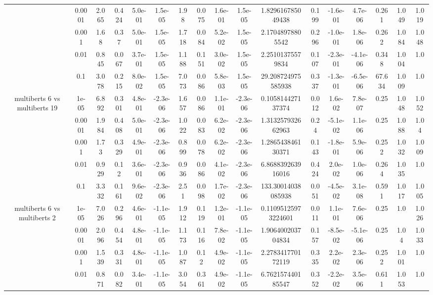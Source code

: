 \begin{tabular}{|c|c|c|c|c|c|c|c|c|c|c|c|c|c|c|c|c|}
 & 0.0001 & 2.065 & 0.424 & 5.0e-01 & 1.5e-05 & 1.98 & 0.075 & 1.6e-01 & 1.5e-05 & 1.829616785049438 & 0.199 & -1.6e-01 & 4.7e-06 & 0.261 & 1.049 & 1.019 \\
 & 0.001 & 1.68 & 0.37 & 5.0e-01 & 1.5e-05 & 1.718 & 0.084 & 5.2e-02 & 1.5e-05 & 2.17048978805542 & 0.296 & -1.0e-01 & 1.8e-06 & 0.262 & 1.084 & 1.048 \\
 & 0.01 & 0.845 & 0.067 & 3.7e-01 & 1.5e-05 & 1.188 & 0.151 & 3.0e-02 & 1.5e-05 & 2.25101375579834 & 0.107 & -2.3e-01 & -4.1e-06 & 0.348 & 1.004 & 1.0 \\
 & 0.1 & 3.078 & 0.215 & 8.0e-02 & 1.5e-05 & 7.073 & 0.086 & 5.8e-03 & 1.5e-05 & 29.208724975585938 & 0.337 & -1.3e-01 & -6.5e-06 & 67.634 & 1.009 & 1.0 \\
\hline
\multirow{5}{*}{multiberts 6 vs multiberts 19} & 1e-05 & 6.892 & 0.301 & 4.8e-01 & -2.3e-06 & 1.657 & 0.086 & 1.1e-01 & -2.3e-06 & 0.105814427137374 & 0.012 & 1.6e-02 & 7.8e-07 & 0.25 & 1.048 & 1.052 \\
 & 0.0001 & 1.984 & 0.408 & 5.0e-01 & -2.3e-06 & 1.022 & 0.083 & 6.2e-02 & -2.3e-06 & 1.313257932662963 & 0.24 & -5.1e-02 & 1.1e-06 & 0.25 & 1.088 & 1.04 \\
 & 0.001 & 1.73 & 0.329 & 4.9e-01 & -2.3e-06 & 0.899 & 0.078 & 6.2e-02 & -2.3e-06 & 1.286543846130371 & 0.143 & -1.8e-01 & 5.9e-06 & 0.252 & 1.032 & 1.009 \\
 & 0.01 & 0.929 & 0.12 & 3.6e-01 & -2.3e-06 & 0.936 & 0.086 & 4.1e-02 & -2.3e-06 & 6.868839263916016 & 0.424 & 2.0e-02 & 1.0e-06 & 0.264 & 1.035 & 1.0 \\
 & 0.1 & 3.332 & 0.161 & 9.6e-02 & -2.3e-06 & 2.51 & 0.098 & 1.7e-02 & -2.3e-06 & 133.30014038085938 & 0.051 & -4.5e-02 & 3.1e-08 & 0.591 & 1.017 & 1.005 \\
\hline
\multirow{5}{*}{multiberts 6 vs multiberts 2} & 1e-05 & 7.026 & 0.296 & 4.6e-01 & -1.1e-05 & 1.912 & 0.119 & 1.2e-01 & -1.1e-05 & 0.11095125973224601 & 0.011 & 1.1e-01 & 7.6e-06 & 0.25 & 1.0 & 1.026 \\
 & 0.0001 & 2.096 & 0.454 & 4.8e-01 & -1.1e-05 & 1.173 & 0.116 & 7.8e-02 & -1.1e-05 & 1.906400203704834 & 0.157 & -8.5e-02 & -5.1e-06 & 0.25 & 1.04 & 1.033 \\
 & 0.001 & 1.539 & 0.331 & 4.8e-01 & -1.1e-05 & 1.087 & 0.12 & 4.9e-02 & -1.1e-05 & 2.278341770172119 & 0.335 & 2.2e-02 & 2.3e-06 & 0.252 & 1.001 & 1.0 \\
 & 0.01 & 0.871 & 0.082 & 3.4e-01 & -1.1e-05 & 3.054 & 0.361 & 4.9e-02 & -1.1e-05 & 6.762157440185547 & 0.352 & -2.2e-02 & 3.5e-06 & 0.611 & 1.053 & 1.0 \\

\end{tabular}
